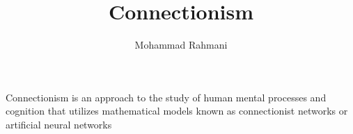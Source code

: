 \documentclass[a4paper]{article}
\title{Connectionism}
\date{}
\author{Mohammad Rahmani}
\begin{document}
    \maketitle
    Connectionism is an approach to the study of human mental processes and cognition that utilizes mathematical models known as connectionist networks or artificial neural networks 
    
    
\end{document}
